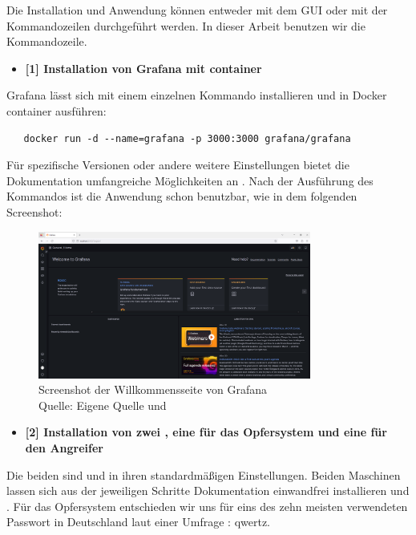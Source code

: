 Die Installation und Anwendung können entweder mit dem \gls{GUI} oder mit der Kommandozeilen durchgeführt werden. In dieser Arbeit benutzen wir die Kommandozeile. 

\begin{itemize}[noitemsep]
   \item \textbf{[1] Installation von Grafana mit \gls{container}}
\end{itemize}

Grafana lässt sich mit einem einzelnen Kommando installieren und in Docker \gls{container} ausführen:

\begin{verbatim}
   docker run -d --name=grafana -p 3000:3000 grafana/grafana
\end{verbatim}

Für spezifische Versionen oder andere weitere Einstellungen bietet die Dokumentation  umfangreiche Möglichkeiten an \citep{Grafana_run}. Nach der Ausführung des Kommandos ist die Anwendung schon benutzbar, wie in dem folgenden Screenshot:

\begin{figure}[H]
   \centering
   \includegraphics[width=0.8\textwidth]{assets/Installation_Grafana.png}
   \caption{Screenshot der Willkommensseite von Grafana\\Quelle: Eigene Quelle und \citep{Grafana_Logs}}
   \centering
\end{figure}

\begin{itemize}[noitemsep]
   \item	\textbf{[2] Installation von zwei , eine für das Opfersystem und eine für den Angreifer}
\end{itemize}

Die beiden  sind  und  in ihren standardmäßigen Einstellungen. Beiden Maschinen lassen sich aus der jeweiligen Schritte Dokumentation einwandfrei installieren \citep{kali_vm} und \citep{Ubuntu_server}. Für das Opfersystem entschieden wir uns für eins des zehn meisten verwendeten Passwort in Deutschland laut einer Umfrage \citep{silicon_passwort}: qwertz.  

